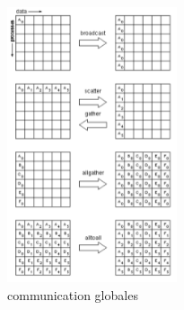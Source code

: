 \documentclass[oneside]{book}
\begin{document}
\begin{figure}[!ht]
\centering
\includegraphics[width = 5cm]{global_comms.png}
\caption{communication globales}
\label{fig:global_comms}
\end{figure}
\end{document}
